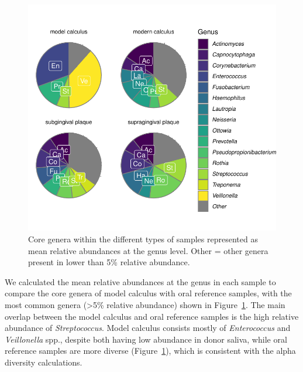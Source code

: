 \documentclass[
]{article}
\begin{document}
\begin{figure}

{\centering \includegraphics{index_files/figure-pdf/fig-core-genera-1.pdf}

}

\caption{\label{fig-core-genera}Core genera within the different types
of samples represented as mean relative abundances at the genus level.
Other = other genera present in lower than 5\% relative abundance.}

\end{figure}

We calculated the mean relative abundances at the genus in each sample
to compare the core genera of model calculus with oral reference
samples, with the most common genera (\textgreater5\% relative
abundance) shown in Figure~\ref{fig-core-genera}. The main overlap
between the model calculus and oral reference samples is the high
relative abundance of \emph{Streptococcus}. Model calculus consists
mostly of \emph{Enterococcus} and \emph{Veillonella} spp., despite both
having low abundance in donor saliva, while oral reference samples are
more diverse (Figure~\ref{fig-core-genera}), which is consistent with
the alpha diversity calculations.
\end{document}
